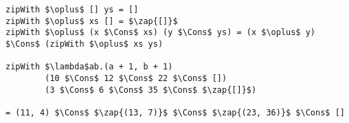 \begin{frame}[fragile]


\begin{lstlisting}[mathescape=true,numbers=none]
zipWith $\oplus$ [] ys = []
zipWith $\oplus$ xs [] = $\zap{[]}$
zipWith $\oplus$ (x $\Cons$ xs) (y $\Cons$ ys) = (x $\oplus$ y) $\Cons$ (zipWith $\oplus$ xs ys)

zipWith $\lambda$ab.(a + 1, b + 1)
        (10 $\Cons$ 12 $\Cons$ 22 $\Cons$ [])
        (3 $\Cons$ 6 $\Cons$ 35 $\Cons$ $\zap{[]}$)

= (11, 4) $\Cons$ $\zap{(13, 7)}$ $\Cons$ $\zap{(23, 36)}$ $\Cons$ []
\end{lstlisting}

\end{frame}
